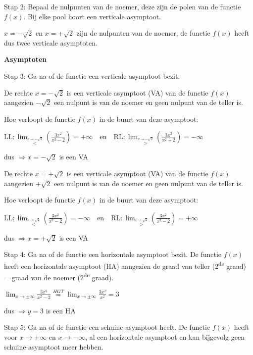 Stap 2: Bepaal de nulpunten van de noemer, deze zijn de polen van
de functie $f(x)$. Bij elke pool hoort een verticale asymptoot.

$x=-\sqrt{2}$ en $x=+\sqrt{2}$ zijn de nulpunten van de noemer,
de functie $f(x)$ heeft dus twee verticale asymptoten.

\medskip{}


\textbf{Asymptoten}

Stap 3: Ga na of de functie een verticale asymptoot bezit. 

De rechte $x=-\sqrt{2}$ is een verticale asymptoot (VA) van de functie
$f(x)$ aangezien $-\sqrt{2}$ een nulpunt is van de noemer en geen
nulpunt van de teller is.

Hoe verloopt de functie $f(x)$ in de buurt van deze asymptoot:

${\displaystyle \textrm{LL}:{\displaystyle {\displaystyle \lim_{\overset{x\rightarrow-\sqrt{2}}{<}}}\left(\frac{3x^{2}}{x^{2}-2}\right)=+\infty\quad\textrm{en}\quad{\displaystyle \textrm{RL}:\lim_{\overset{x\rightarrow-\sqrt{2}}{>}}}\left(\frac{3x^{2}}{x^{2}-2}\right)=-\infty}}$

dus ${\displaystyle \Rightarrow x=-\sqrt{2}}$ is een VA\medskip{}


De rechte $x=+\sqrt{2}$ is een verticale asymptoot (VA) van de functie
$f(x)$ aangezien $+\sqrt{2}$ een nulpunt is van de noemer en geen
nulpunt van de teller is.

Hoe verloopt de functie $f(x)$ in de buurt van deze asymptoot:

${\displaystyle \textrm{LL}:{\displaystyle {\displaystyle \lim_{\overset{x\rightarrow\sqrt{2}}{<}}}\left(\frac{3x^{2}}{x^{2}-2}\right)=-\infty\quad\textrm{en}\quad{\displaystyle \textrm{RL}:\lim_{\overset{x\rightarrow\sqrt{2}}{>}}}\left(\frac{3x^{2}}{x^{2}-2}\right)=+\infty}}$

dus ${\displaystyle \Rightarrow x=+\sqrt{2}}$ is een VA\medskip{}


Stap 4: Ga na of de functie een horizontale asymptoot bezit. De functie
$f(x)$ heeft een horizontale asymptoot (HA) aangezien de graad van
teller (2\textsuperscript{de} graad) = graad van de noemer (2\textsuperscript{de}
graad).

${\displaystyle {\displaystyle {\displaystyle \lim_{x\to\pm\infty}}\frac{3x^{2}}{x^{2}-2}}\overset{HGT}{=}{\displaystyle \lim_{x\to\pm\infty}}\frac{3x^{2}}{x^{2}}=3}$

dus ${\displaystyle \Rightarrow y=3}$ is een HA\medskip{}


Stap 5: Ga na of de functie een schuine asymptoot heeft. De functie
$f(x)$ heeft voor $x\rightarrow+\infty$ en $x\rightarrow-\infty$,
al een horizontale asymptoot en kan bijgevolg geen schuine asymptoot
meer hebben.\medskip{}


